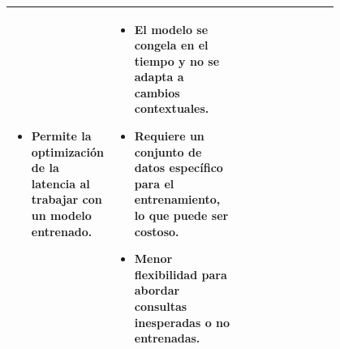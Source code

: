 \begin{table}[ht]
\begin{tabular}{l p{0.4\linewidth} p{0.4\linewidth}}
\begin{itemize}
                \item Permite la optimización de la latencia al trabajar con un modelo entrenado.
            \end{itemize} &
            \begin{itemize}
                \item El modelo se congela en el tiempo y no se adapta a cambios contextuales.
                \item Requiere un conjunto de datos específico para el entrenamiento, lo que puede ser costoso.
                \item Menor flexibilidad para abordar consultas inesperadas o no entrenadas.
            \end{itemize} \\
            \bottomrule
        \end{tabular}
        \label{tab:rag_vs_finetuning}
    \end{table}

 